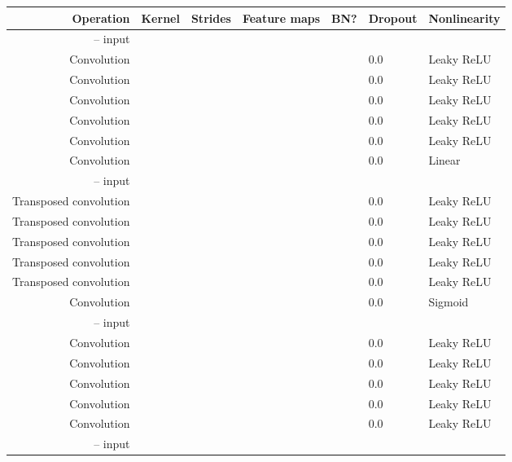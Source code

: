 \documentclass{article}
\begin{document}
\begin{table}[h]
\centering
\begin{tabular}{@{}rllllll@{}} \toprule
Operation              & Kernel       & Strides      & Feature maps & BN?          & Dropout & Nonlinearity \\ \midrule
 --  input                                                                 \\
Convolution            &  &  &          &       & 0.0     & Leaky ReLU \\
Convolution            &  &  &         &       & 0.0     & Leaky ReLU \\
Convolution            &  &  &         &       & 0.0     & Leaky ReLU \\
Convolution            &  &  &         &       & 0.0     & Leaky ReLU \\
Convolution            &  &  &         &       & 0.0     & Leaky ReLU \\
Convolution            &  &  &         &      & 0.0     & Linear     \\
 --  input                                                                 \\
Transposed convolution &  &  &         &       & 0.0     & Leaky ReLU \\
Transposed convolution &  &  &         &       & 0.0     & Leaky ReLU \\
Transposed convolution &  &  &          &       & 0.0     & Leaky ReLU \\
Transposed convolution &  &  &          &       & 0.0     & Leaky ReLU \\
Transposed convolution &  &  &          &       & 0.0     & Leaky ReLU \\
Convolution            &  &  &           &      & 0.0     & Sigmoid    \\
 --  input                                                                   \\
Convolution            &  &  &          &       & 0.0     & Leaky ReLU \\
Convolution            &  &  &         &       & 0.0     & Leaky ReLU \\
Convolution            &  &  &         &       & 0.0     & Leaky ReLU \\
Convolution            &  &  &         &       & 0.0     & Leaky ReLU \\
Convolution            &  &  &         &       & 0.0     & Leaky ReLU \\
 --  input                                                                   \\

\end{tabular}
\end{table}
\end{document}
